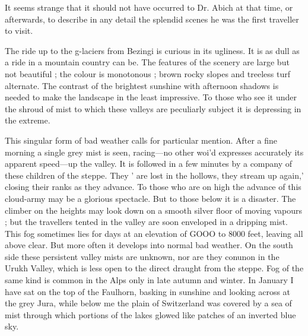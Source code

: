\documentclass[25pt, a4paper]{article}
\begin{document}
	It seems strange that it should not have occurred to Dr. Abich at that time, or afterwards, to describe in any detail the splendid scenes he was the first traveller to visit.
	
	The ride up to the g-laciers from Bezingi is curious in its ugliness. It is as dull as a ride in a mountain country can be. The features of the scenery are large but not beautiful ; the colour is monotonous ; brown rocky slopes and treeless turf alternate. The contrast of the brightest sunshine with afternoon shadows is needed to make the landscape in the least impressive. To those who see it under the shroud of mist to which these valleys are peculiarly subject it is depressing in the extreme.
	
	This singular form of bad weather calls for particular mention. After a fine morning a single grey mist is seen, racing—no other woi'd expresses accurately its apparent speed—up the valley. It is followed in a few minutes by a company of these children of the steppe. They ' are lost in the hollows, they stream up again,' closing their ranks as they advance. To those who are on high the advance of this cloud-army may be a glorious spectacle. But to those below it is a disaster. The climber on the heights may look down on a smooth silver floor of moving vapours ; but the travellers tented in the valley are soon enveloped in a dripping mist. This fog sometimes lies for days at an elevation of GOOO to 8000 feet, leaving all above clear. But more often it develops into normal bad weather. On the south side these persistent valley mists are unknown, nor are they conunon in the Urukh Valley, which is less open to the direct draught from the steppe. Fog of the same kind is common in the Alps only in late autumn and winter. In January I have sat on the top of the Faulhorn, basking in sunshine and looking across at the grey Jura, while below me the plain of Switzerland was covered by a sea of mist through which portions of the lakes glowed like patches of an inverted blue sky.
	
\end{document}
